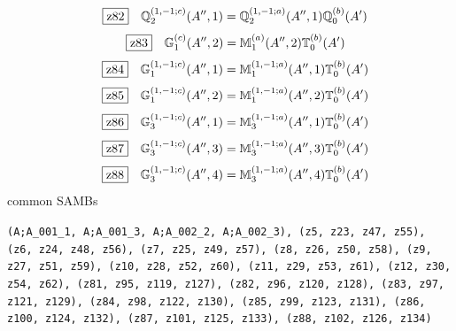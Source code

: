 \documentclass[fleqn,10pt,landscape]{jsarticle}
\begin{document}
\begin{dmath*}
\hspace*{3mm}\fbox{z82}\quad \mathbb{Q}_{2}^{(1,-1;c)}(A^{\prime\prime},1)=\mathbb{Q}_{2}^{(1,-1;a)}(A^{\prime\prime},1) \mathbb{Q}_{0}^{(b)}(A^{\prime})
\end{dmath*}
\begin{dmath*}
\hspace*{3mm}\fbox{z83}\quad \mathbb{G}_{1}^{(c)}(A^{\prime\prime},2)=\mathbb{M}_{1}^{(a)}(A^{\prime\prime},2) \mathbb{T}_{0}^{(b)}(A^{\prime})
\end{dmath*}
\begin{dmath*}
\hspace*{3mm}\fbox{z84}\quad \mathbb{G}_{1}^{(1,-1;c)}(A^{\prime\prime},1)=\mathbb{M}_{1}^{(1,-1;a)}(A^{\prime\prime},1) \mathbb{T}_{0}^{(b)}(A^{\prime})
\end{dmath*}
\begin{dmath*}
\hspace*{3mm}\fbox{z85}\quad \mathbb{G}_{1}^{(1,-1;c)}(A^{\prime\prime},2)=\mathbb{M}_{1}^{(1,-1;a)}(A^{\prime\prime},2) \mathbb{T}_{0}^{(b)}(A^{\prime})
\end{dmath*}
\begin{dmath*}
\hspace*{3mm}\fbox{z86}\quad \mathbb{G}_{3}^{(1,-1;c)}(A^{\prime\prime},1)=\mathbb{M}_{3}^{(1,-1;a)}(A^{\prime\prime},1) \mathbb{T}_{0}^{(b)}(A^{\prime})
\end{dmath*}
\begin{dmath*}
\hspace*{3mm}\fbox{z87}\quad \mathbb{G}_{3}^{(1,-1;c)}(A^{\prime\prime},3)=\mathbb{M}_{3}^{(1,-1;a)}(A^{\prime\prime},3) \mathbb{T}_{0}^{(b)}(A^{\prime})
\end{dmath*}
\begin{dmath*}
\hspace*{3mm}\fbox{z88}\quad \mathbb{G}_{3}^{(1,-1;c)}(A^{\prime\prime},4)=\mathbb{M}_{3}^{(1,-1;a)}(A^{\prime\prime},4) \mathbb{T}_{0}^{(b)}(A^{\prime})
\end{dmath*}
\noindent * common SAMBs

\noindent\texttt{(A;A_001_1, A;A_001_3, A;A_002_2, A;A_002_3), (z5, z23, z47, z55), (z6, z24, z48, z56), (z7, z25, z49, z57), (z8, z26, z50, z58), (z9, z27, z51, z59), (z10, z28, z52, z60), (z11, z29, z53, z61), (z12, z30, z54, z62), (z81, z95, z119, z127), (z82, z96, z120, z128), (z83, z97, z121, z129), (z84, z98, z122, z130), (z85, z99, z123, z131), (z86, z100, z124, z132), (z87, z101, z125, z133), (z88, z102, z126, z134)}
\vspace{5mm}
\end{document}
